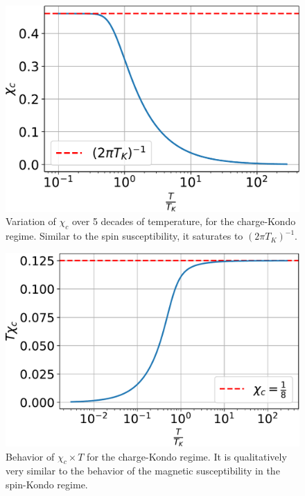 \documentclass[twoside,11pt]{report}
\numberwithin{equation}{section}
\begin{document}
\begin{figure}[htpb]
	\centering
	\includegraphics[height=0.27\textheight]{../figures/chi_c_new.pdf}
	\caption{Variation of \(\chi_c\) over 5 decades of temperature, for the charge-Kondo regime. Similar to the spin susceptibility, it saturates to \(\left( 2\pi T_K \right)^{-1}\).}
	\label{charge_sus}
\end{figure}
\begin{figure}[htpb]
	\centering
	\includegraphics[height=0.27\textheight]{../figures/T_chi_c_new.pdf}
	\caption{Behavior of \(\chi_c\times T\) for the charge-Kondo regime. It is qualitatively very similar to the behavior of the magnetic susceptibility in the spin-Kondo regime.}
	\label{chcT}
\end{figure}
\end{document}
